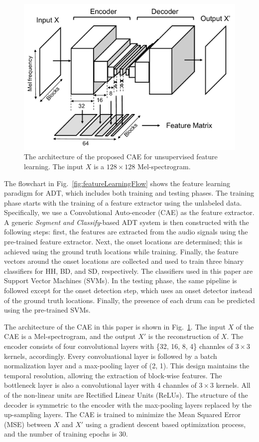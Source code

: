 \documentclass{article}
\begin{document}
\begin{figure}
\centering
\includegraphics[width = \columnwidth]{./figs/caeStructure.pdf}
\caption{The architecture of the proposed CAE for unsupervised feature learning. The input $X$ is a $128 \times 128$ Mel-spectrogram.}
\label{fig:caeStructure}
\end{figure}

The flowchart in Fig.~\ref{fig:featureLearningFlow} shows the feature learning paradigm for ADT, which includes both training and testing phases. The training phase starts with the training of a feature extractor using the unlabeled data. Specifically, we use a Convolutional Auto-encoder (CAE) as the feature extractor. A generic \textit{Segment and Classify}-based ADT system is then constructed with the following steps: first, the features are extracted from the audio signals using the pre-trained feature extractor. Next, the onset locations are determined; this is achieved using the ground truth locations while training. Finally, the feature vectors around the onset locations are collected and used to train three binary classifiers for HH, BD, and SD, respectively. The classifiers used in this paper are Support Vector Machines (SVMs). In the testing phase, the same pipeline is followed except for the onset detection step, which uses an onset detector instead of the ground truth locations. Finally, the presence of each drum can be predicted using the pre-trained SVMs. 

The architecture of the CAE in this paper is shown in Fig.~\ref{fig:caeStructure}. The input $X$ of the CAE is a Mel-spectrogram, and the output $X'$ is the reconstruction of $X$. The encoder consists of four convolutional layers with \{32, 16, 8, 4\} channles of $3 \times 3$ kernels, accordingly. Every convoluational layer is followed by a batch normalization layer and a max-pooling layer of (2, 1). This design maintains the temporal resolution, allowing the extraction of block-wise features. 
The bottleneck layer is also a convolutional layer with 4 channles of $3 \times 3$ kernels. All of the non-linear units are Rectified Linear Units (ReLUs).
The structure of the decoder is symmetric to the encoder with the max-pooling layers replaced by the up-sampling layers.  
The CAE is trained to minimize the Mean Squared Error (MSE) between $X$ and $X'$ using a gradient descent based optimization process, and the number of training epochs is $30$. 
\end{document}
